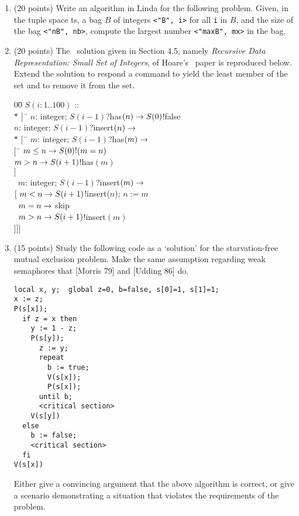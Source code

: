 \begin{enumerate}
\vfill
\item (20 points)
Write an algorithm in Linda for the following problem.  Given, in the
tuple space {\sc ts}, a bag $B$ of integers {\tt <"B", i>} for all
{\tt i} in $B$, and the size of the bag {\tt <"nB", nb>}, compute the
largest number {\tt <"maxB", mx>} in the bag.

\vfill
\item (20 points)
The \CSP\ solution given in Section 4.5, namely {\sl Recursive Data
Representation: Small Set of Integers}, of Hoare's \CSP\ paper is
reproduced below.  Extend the solution to respond a command to
yield the least member of the set and to remove it from the set.

\newpage
\begin{tabbing}
00\=\kill
$S(i: 1 .. 100)$ ::\+\\
$ *$\= $[\ $ \= $n$: integer; $S(i-1)$?has$(n) \rightarrow S(0)$!false\+\\
 \fat\> $n$: integer; $S(i-1)$?insert$(n) \rightarrow$\+\\
     $*$\= $[\ $ \= $m$: \= integer; $S(i-1)$?has$(m) \rightarrow$\+\+\\
       $[$\ \= $m \leq n \rightarrow S(0)!(m = n)$\\
       \fat \> $m > n \rightarrow S(i+1)$!has$(m)$\\
       $]$ \-\-\\
  \> \fat\ $m$: integer; $S(i-1)$?insert$(m) \rightarrow$\+\+\\
    $[\  m < n \rightarrow S(i+1)$!insert($n$); $n := m$\\
    \fat\ $m = n \rightarrow $ skip\\
    \fat\ $m > n \rightarrow S(i+1)$!insert$(m)$\-\-\-\\
]\>\>]\>]\\
\end{tabbing}


\item (15 points)
Study the following code as a `solution' for the starvation-free
mutual exclusion problem.  Make the same assumption regarding weak
semaphores that [Morris 79] and [Udding 86] do.

\begin{verbatim}
local x, y;  global z=0, b=false, s[0]=1, s[1]=1;
x := z;
P(s[x]);
  if z = x then
    y := 1 - z;
    P(s[y]);
      z := y;
      repeat
        b := true;
        V(s[x]);
        P(s[x]);
      until b;
      <critical section>
    V(s[y])
  else
    b := false;
    <critical section>
  fi
V(s[x])
\end{verbatim}
Either give a convincing argument that the above algorithm is correct,
or give a scenario demonstrating a situation that violates the
requirements of the problem.
\end{enumerate}




